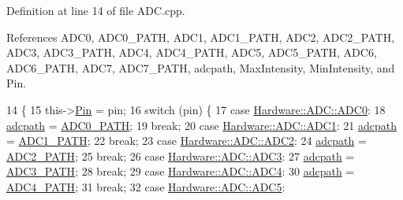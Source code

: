 Definition at line 14 of file A\+D\+C.\+cpp.



References A\+D\+C0, A\+D\+C0\+\_\+\+P\+A\+T\+H, A\+D\+C1, A\+D\+C1\+\_\+\+P\+A\+T\+H, A\+D\+C2, A\+D\+C2\+\_\+\+P\+A\+T\+H, A\+D\+C3, A\+D\+C3\+\_\+\+P\+A\+T\+H, A\+D\+C4, A\+D\+C4\+\_\+\+P\+A\+T\+H, A\+D\+C5, A\+D\+C5\+\_\+\+P\+A\+T\+H, A\+D\+C6, A\+D\+C6\+\_\+\+P\+A\+T\+H, A\+D\+C7, A\+D\+C7\+\_\+\+P\+A\+T\+H, adcpath, Max\+Intensity, Min\+Intensity, and Pin.


\begin{DoxyCode}
14                    \{
15   this->\hyperlink{class_hardware_1_1_a_d_c_acb6d23369c7047296af402ca480bb2f5}{Pin} = pin;
16   \textcolor{keywordflow}{switch} (pin) \{
17   \textcolor{keywordflow}{case} \hyperlink{class_hardware_1_1_a_d_c_adb1507998c096cbdf7031527f6a690cfaaad3628f17c4d36b8d16123e7017ad63}{Hardware::ADC::ADC0}:
18     \hyperlink{class_hardware_1_1_a_d_c_a820ce4f097a70b95246049f9ea01df21}{adcpath} = \hyperlink{_a_d_c_8h_a597a5b4b81296d8d567bb8251f29e51c}{ADC0\_PATH};
19     \textcolor{keywordflow}{break};
20   \textcolor{keywordflow}{case} \hyperlink{class_hardware_1_1_a_d_c_adb1507998c096cbdf7031527f6a690cfa73b7008767a7fb434c949c821b5872dc}{Hardware::ADC::ADC1}:
21     \hyperlink{class_hardware_1_1_a_d_c_a820ce4f097a70b95246049f9ea01df21}{adcpath} = \hyperlink{_a_d_c_8h_a042dc32b894680e50456be83ef44a281}{ADC1\_PATH};
22     \textcolor{keywordflow}{break};
23   \textcolor{keywordflow}{case} \hyperlink{class_hardware_1_1_a_d_c_adb1507998c096cbdf7031527f6a690cfac987eb1ee9899deeff5ac8408fc6de43}{Hardware::ADC::ADC2}:
24     \hyperlink{class_hardware_1_1_a_d_c_a820ce4f097a70b95246049f9ea01df21}{adcpath} = \hyperlink{_a_d_c_8h_aef98ab917652798392be4055763d53f1}{ADC2\_PATH};
25     \textcolor{keywordflow}{break};
26   \textcolor{keywordflow}{case} \hyperlink{class_hardware_1_1_a_d_c_adb1507998c096cbdf7031527f6a690cfad2fdc97805c79963cbf91e2dd130f02a}{Hardware::ADC::ADC3}:
27     \hyperlink{class_hardware_1_1_a_d_c_a820ce4f097a70b95246049f9ea01df21}{adcpath} = \hyperlink{_a_d_c_8h_a97ea71f953cb0949dd23883f4193b454}{ADC3\_PATH};
28     \textcolor{keywordflow}{break};
29   \textcolor{keywordflow}{case} \hyperlink{class_hardware_1_1_a_d_c_adb1507998c096cbdf7031527f6a690cfa6c75e50b9369191173e49be9d5c72eeb}{Hardware::ADC::ADC4}:
30     \hyperlink{class_hardware_1_1_a_d_c_a820ce4f097a70b95246049f9ea01df21}{adcpath} = \hyperlink{_a_d_c_8h_aa766e25698fd1ec953a05b82870c1bb9}{ADC4\_PATH};
31     \textcolor{keywordflow}{break};
32   \textcolor{keywordflow}{case} \hyperlink{class_hardware_1_1_a_d_c_adb1507998c096cbdf7031527f6a690cfa0357d1e409dc31cb4300cfd2dcd4c32d}{Hardware::ADC::ADC5}:

\end{DoxyCode}
